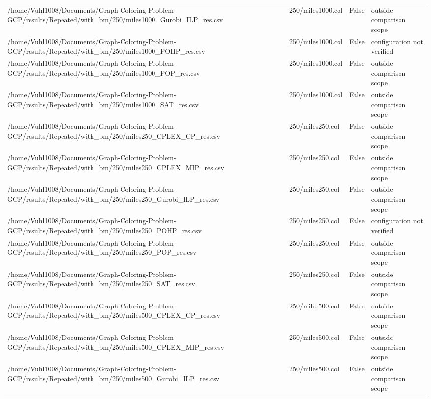 \begin{table}[htbp]
\begin{tabular}{llll}
/home/Vuhl1008/Documents/Graph-Coloring-Problem-GCP/results/Repeated/with\_bm/250/miles1000\_Gurobi\_ILP\_res.csv & 250/miles1000.col & False & outside comparison scope \\
/home/Vuhl1008/Documents/Graph-Coloring-Problem-GCP/results/Repeated/with\_bm/250/miles1000\_POHP\_res.csv & 250/miles1000.col & False & configuration not verified \\
/home/Vuhl1008/Documents/Graph-Coloring-Problem-GCP/results/Repeated/with\_bm/250/miles1000\_POP\_res.csv & 250/miles1000.col & False & outside comparison scope \\
/home/Vuhl1008/Documents/Graph-Coloring-Problem-GCP/results/Repeated/with\_bm/250/miles1000\_SAT\_res.csv & 250/miles1000.col & False & outside comparison scope \\
/home/Vuhl1008/Documents/Graph-Coloring-Problem-GCP/results/Repeated/with\_bm/250/miles250\_CPLEX\_CP\_res.csv & 250/miles250.col & False & outside comparison scope \\
/home/Vuhl1008/Documents/Graph-Coloring-Problem-GCP/results/Repeated/with\_bm/250/miles250\_CPLEX\_MIP\_res.csv & 250/miles250.col & False & outside comparison scope \\
/home/Vuhl1008/Documents/Graph-Coloring-Problem-GCP/results/Repeated/with\_bm/250/miles250\_Gurobi\_ILP\_res.csv & 250/miles250.col & False & outside comparison scope \\
/home/Vuhl1008/Documents/Graph-Coloring-Problem-GCP/results/Repeated/with\_bm/250/miles250\_POHP\_res.csv & 250/miles250.col & False & configuration not verified \\
/home/Vuhl1008/Documents/Graph-Coloring-Problem-GCP/results/Repeated/with\_bm/250/miles250\_POP\_res.csv & 250/miles250.col & False & outside comparison scope \\
/home/Vuhl1008/Documents/Graph-Coloring-Problem-GCP/results/Repeated/with\_bm/250/miles250\_SAT\_res.csv & 250/miles250.col & False & outside comparison scope \\
/home/Vuhl1008/Documents/Graph-Coloring-Problem-GCP/results/Repeated/with\_bm/250/miles500\_CPLEX\_CP\_res.csv & 250/miles500.col & False & outside comparison scope \\
/home/Vuhl1008/Documents/Graph-Coloring-Problem-GCP/results/Repeated/with\_bm/250/miles500\_CPLEX\_MIP\_res.csv & 250/miles500.col & False & outside comparison scope \\
/home/Vuhl1008/Documents/Graph-Coloring-Problem-GCP/results/Repeated/with\_bm/250/miles500\_Gurobi\_ILP\_res.csv & 250/miles500.col & False & outside comparison scope \\

\end{tabular}
\end{table}
